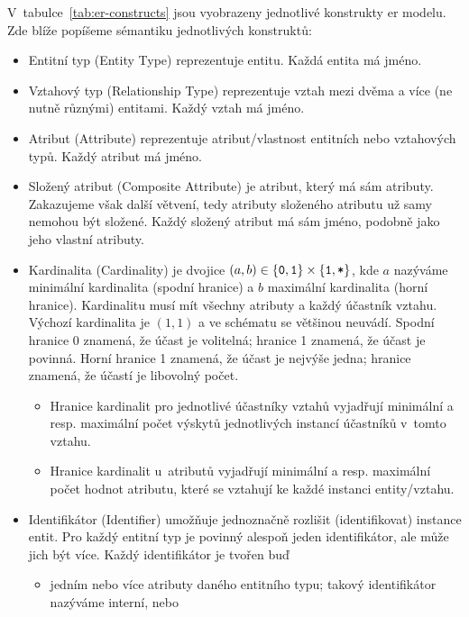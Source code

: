 V~tabulce~\ref{tab:er-constructs} jsou vyobrazeny jednotlivé konstrukty \acrshort{er} modelu.
Zde blíže popíšeme sémantiku jednotlivých konstruktů:
\begin{itemize}
  \item Entitní typ (Entity Type) reprezentuje entitu.
        Každá entita má jméno.
  \item Vztahový typ (Relationship Type) reprezentuje vztah mezi dvěma a více (ne nutně různými) entitami.
        Každý vztah má jméno.
  \item Atribut (Attribute) reprezentuje atribut/vlastnost entitních nebo vztahových typů.
        Každý atribut má jméno.
  \item Složený atribut (Composite Attribute) je atribut, který má sám atributy.
        Zakazujeme však další větvení, tedy atributy složeného atributu už samy nemohou být složené.
        Každý složený atribut má sám jméno, podobně jako jeho vlastní atributy.
  \item \label{def:cardinality}Kardinalita (Cardinality) je dvojice $(a, b) \in \left\{\texttt{0}, \texttt{1}\right\}\times \left\{\texttt{1}, \texttt{*}\right\}$, kde $a$ nazýváme minimální kardinalita (spodní hranice) a $b$ maximální kardinalita (horní hranice).
        Kardinalitu musí mít všechny atributy a každý účastník vztahu.
        Výchozí kardinalita je $(1, 1)$ a ve schématu se většinou neuvádí.
        Spodní hranice 0 znamená, že účast je volitelná; hranice 1 znamená, že účast je povinná.
        Horní hranice 1 znamená, že účast je nejvýše jedna; hranice~\many{} znamená, že účastí je libovolný počet.
        \begin{itemize}
          \item Hranice kardinalit pro jednotlivé účastníky vztahů vyjadřují minimální a resp. maximální počet výskytů jednotlivých instancí účastníků v~tomto vztahu.
          \item Hranice kardinalit u~atributů vyjadřují minimální a resp. maximální počet hodnot atributu, které se vztahují ke každé instanci entity/vztahu.
        \end{itemize}
  \item Identifikátor (Identifier) umožňuje jednoznačně rozlišit (identifikovat) instance entit.
        Pro každý entitní typ je povinný alespoň jeden identifikátor, ale může jich být více.
        Každý identifikátor je tvořen buď
        \begin{itemize}
          \item jedním nebo více atributy daného entitního typu; takový identifikátor nazýváme interní, nebo

\end{itemize}
\end{itemize}
